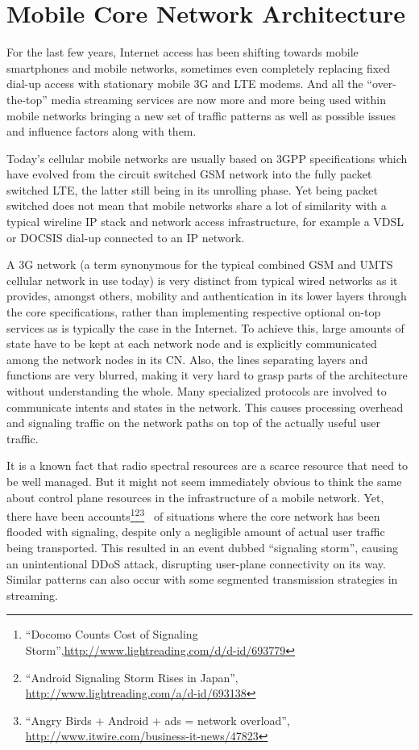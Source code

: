 \chapter{Mobile Core Network Architecture}
\label{chap:mobilenets}

For the last few years, Internet access has been shifting towards mobile smartphones and mobile networks, sometimes even completely replacing fixed dial-up access with stationary mobile \gls{3G} and \gls{LTE} modems. And all the ``over-the-top'' media streaming services are now more and more being used within mobile networks bringing a new set of traffic patterns as well as possible issues and influence factors along with them.

Today's cellular mobile networks are usually based on \gls{3GPP} specifications which have evolved from the circuit switched \gls{GSM} network into the fully packet switched \gls{LTE}, the latter still being in its unrolling phase. Yet being packet switched does not mean that mobile networks share a lot of similarity with a typical wireline \gls{IP} stack and network access infrastructure, for example a \gls{VDSL} or \gls{DOCSIS} dial-up connected to an \gls{IP} network.

A \gls{3G} network (a term synonymous for the typical combined \gls{GSM} and \gls{UMTS} cellular network in use today) is very distinct from typical wired networks as it provides, amongst others, mobility and authentication in its lower layers through the core specifications, rather than implementing respective optional on-top services as is typically the case in the Internet. To achieve this, large amounts of state have to be kept at each network node and is explicitly communicated among the network nodes in its \gls{CN}. Also, the lines separating layers and functions are very blurred, making it very hard to grasp parts of the architecture without understanding the whole. Many specialized protocols are involved to communicate intents and states in the network. This causes processing overhead and signaling traffic on the network paths on top of the actually useful user traffic. 

It is a known fact that radio spectral resources are a scarce resource that need to be well managed. But it might not seem immediately obvious to think the same about control plane resources in the infrastructure of a mobile network. Yet, there have been accounts\footnote{``Docomo Counts Cost of Signaling Storm'',\url{http://www.lightreading.com/d/d-id/693779}}\footnote{``Android Signaling Storm Rises in Japan'', \url{http://www.lightreading.com/a/d-id/693138}}\footnote{``Angry Birds + Android + ads = network overload'', \url{http://www.itwire.com/business-it-news/47823}}~\cite{huawei2011storm} of situations where the core network has been flooded with signaling, despite only a negligible amount of actual user traffic being transported. This resulted in an event dubbed ``signaling storm'', causing an unintentional \gls{DDoS} attack, disrupting user-plane connectivity on its way. Similar patterns can also occur with some segmented transmission strategies in streaming.


